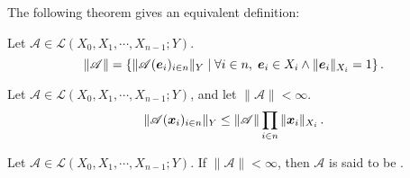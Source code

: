 \documentclass[openany]{book}
\begin{document}
The following theorem gives an equivalent definition:

\begin{theorem}
	Let $\mathscr A \in \mathcal L(X_0, X_1, \cdots, X_{n - 1}; Y)$.
	\begin{equation}
		\|\mathscr A\| = 
		\{ 
			\|\mathscr A(\boldsymbol{e}_i)_{i \in n}\|_Y
		\mid
			\forall i \in n,\; \boldsymbol{e}_i \in X_i \wedge \|\boldsymbol{e}_i\|_{X_i} = 1
		\} \,.
	\end{equation}
\end{theorem}

\begin{theorem}
	Let $\mathscr A \in \mathcal L(X_0, X_1, \cdots, X_{n - 1}; Y)$, and let $\|\mathscr A\| < \infty$.
	\begin{equation}
		\|\mathscr A(\boldsymbol{x}_i)_{i \in n}\|_Y 
			\leq \|\mathscr A\| \prod_{i \in n} \|\boldsymbol{x}_i\|_{X_i}\,.
	\end{equation}
\end{theorem}

\begin{definition}
	Let $\mathscr A \in \mathcal L(X_0, X_1, \cdots, X_{n - 1}; Y)$. 
	If $\|\mathscr A\| < \infty$, then $\mathscr A$ is said to be .
\end{definition}
\end{document}
